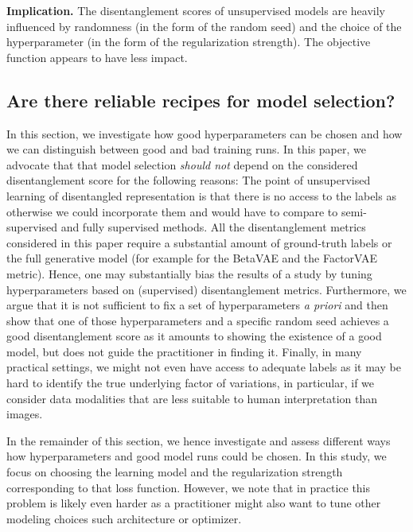 \documentclass{article}
\begin{document}
\textbf{Implication.} 
The disentanglement scores of unsupervised models are heavily influenced by randomness (in the form of the random seed) and the choice of the hyperparameter (in the form of the regularization strength). The objective function appears to have less impact.

\subsection{Are there reliable recipes for model selection?} 
In this section, we investigate how good hyperparameters can be chosen and how we can distinguish between good and bad training runs. 
In this paper, we advocate that that model selection \emph{should not} depend on the considered disentanglement score for the following reasons:
The point of unsupervised learning of disentangled representation is that there is no access to the labels as otherwise we could incorporate them and would have to compare to semi-supervised and fully supervised methods.
All the disentanglement metrics considered in this paper require a substantial amount of ground-truth labels or the full generative model (for example for the BetaVAE and the FactorVAE metric).
Hence, one may substantially bias the results of a study by tuning hyperparameters based on (supervised) disentanglement metrics. 
Furthermore, we argue that it is not sufficient to fix a set of hyperparameters \emph{a priori} and then show that one of those hyperparameters and a specific random seed achieves a good disentanglement score as it amounts to showing the existence of a good model, but does not guide the practitioner in finding it.
Finally, in many practical settings, we might not even have access to adequate labels as it may be hard to identify the true underlying factor of variations, in particular, if we consider data modalities that are less suitable to human interpretation than images.

In the remainder of this section, we hence investigate and assess different ways how hyperparameters and good model runs could be chosen.
In this study, we focus on choosing the learning model and the regularization strength corresponding to that loss function.
However, we note that in practice this problem is likely even harder as a practitioner might also want to tune other modeling choices such architecture or optimizer.
 
\end{document}
